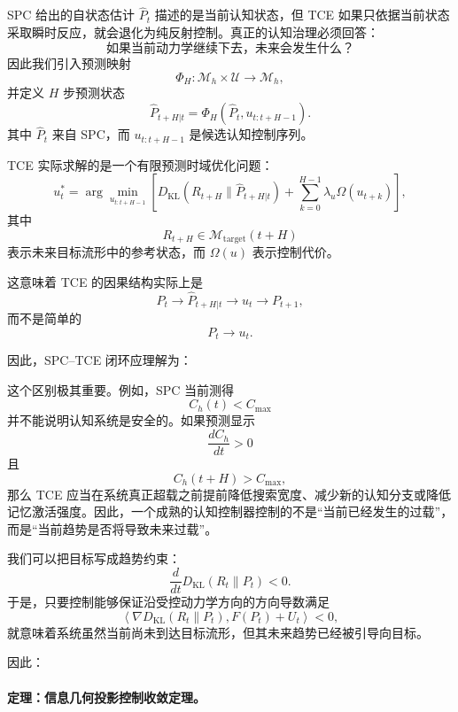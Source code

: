 SPC 给出的自状态估计 $\hat P_t$ 描述的是当前认知状态，但 TCE 如果只依据当前状态采取瞬时反应，就会退化为纯反射控制。真正的认知治理必须回答：
\[
\text{如果当前动力学继续下去，未来会发生什么？}
\]
因此我们引入预测映射
\[
\Phi_H:
\mathcal{M}_{h}\times\mathcal{U}
\rightarrow
\mathcal{M}_{h},
\]
并定义 $H$ 步预测状态
\[
\widehat P_{t+H|t}
=
\Phi_H
\left(
\hat P_t,
u_{t:t+H-1}
\right).
\]
其中 $\hat P_t$ 来自 SPC，而 $u_{t:t+H-1}$ 是候选认知控制序列。

TCE 实际求解的是一个有限预测时域优化问题：
\[
u_t^{*}
=
\arg\min_{u_{t:t+H-1}}
\left[
D_{\mathrm{KL}}
\left(
R_{t+H}
\|
\widehat P_{t+H|t}
\right)
+
\sum_{k=0}^{H-1}
\lambda_u
\Omega(u_{t+k})
\right],
\label{eq:predictive-information-geometric-control}
\]
其中
\[
R_{t+H}
\in
\mathcal{M}_{\mathrm{target}}(t+H)
\]
表示未来目标流形中的参考状态，而 $\Omega(u)$ 表示控制代价。

这意味着 TCE 的因果结构实际上是
\[
P_t
\rightarrow
\widehat P_{t+H|t}
\rightarrow
u_t
\rightarrow
P_{t+1},
\]
而不是简单的
\[
P_t
\rightarrow
u_t.
\]

因此，SPC--TCE 闭环应理解为：
\begin{statementbox}
\centering
{}
\end{statementbox}

这个区别极其重要。例如，SPC 当前测得
\[
C_h(t)<C_{\max}
\]
并不能说明认知系统是安全的。如果预测显示
\[
\frac{dC_h}{dt}>0
\]
且
\[
C_h(t+H)>C_{\max},
\]
那么 TCE 应当在系统真正超载之前提前降低搜索宽度、减少新的认知分支或降低记忆激活强度。因此，一个成熟的认知控制器控制的不是``当前已经发生的过载''，而是``当前趋势是否将导致未来过载''。

我们可以把目标写成趋势约束：
\[
\frac{d}{dt}
D_{\mathrm{KL}}
\left(
R_t\|P_t
\right)
<0.
\]
于是，只要控制能够保证沿受控动力学方向的方向导数满足
\[
\left\langle
\nabla D_{\mathrm{KL}}(R_t\|P_t),
F(P_t)+U_t
\right\rangle
<0,
\]
就意味着系统虽然当前尚未到达目标流形，但其未来趋势已经被引导向目标。

因此：
\begin{statementbox}
\centering
{}
\end{statementbox}

\paragraph{定理：信息几何投影控制收敛定理。}

